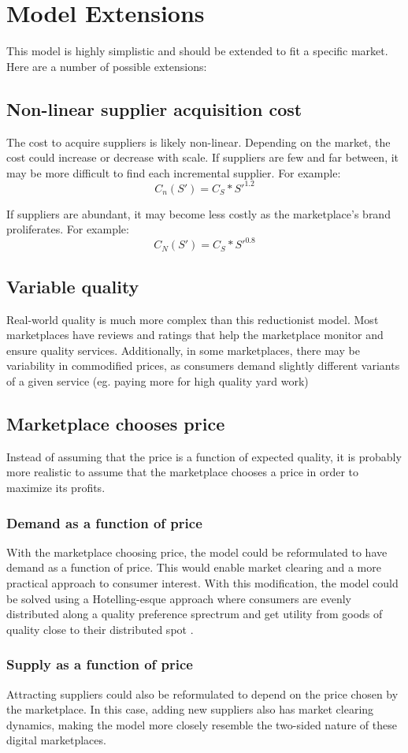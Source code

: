 \section{Model Extensions}

This model is highly simplistic and should be extended to fit a specific market. Here are a number of possible extensions:

\subsection{Non-linear supplier acquisition cost}
The cost to acquire suppliers is likely non-linear. Depending on the market, the cost could increase or decrease with scale.
If suppliers are few and far between, it may be more difficult to find each incremental supplier. For example:
\[ C_n(S') = C_S*S'^1.2 \]

If suppliers are abundant, it may become less costly as the marketplace's brand proliferates. For example:
\[ C_N(S') = C_S*S'^0.8 \]

\subsection{Variable quality}
Real-world quality is much more complex than this reductionist model. Most marketplaces have reviews and ratings that help the marketplace monitor and ensure quality services. Additionally, in some marketplaces, there may be variability in commodified prices, as consumers demand slightly different variants of a given service (eg. paying more for high quality yard work)

\subsection{Marketplace chooses price}

Instead of assuming that the price is a function of expected quality, it is probably more realistic to assume that the marketplace chooses a price in order to maximize its profits.

\subsubsection{Demand as a function of price}

With the marketplace choosing price, the model could be reformulated to have demand as a function of price. This would enable market clearing and a more practical approach to consumer interest. With this modification, the model could be solved using a Hotelling-esque approach where consumers are evenly distributed along a quality preference sprectrum and get utility from goods of quality close to their distributed spot \citep{hotelling}.

\subsubsection{Supply as a function of price}

Attracting suppliers could also be reformulated to depend on the price chosen by the marketplace. In this case, adding new suppliers also has market clearing dynamics, making the model more closely resemble the two-sided nature of these digital marketplaces.
